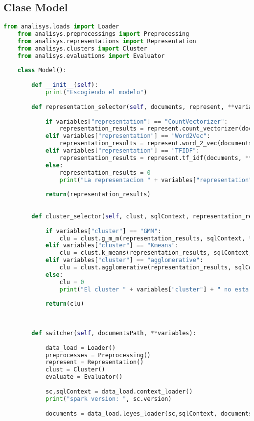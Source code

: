 \documentclass[12pt]{article}
\begin{document}
	\subsection{ Clase Model}
	\begin{lstlisting}[language=Python, caption= Clase model]
	from analisys.loads import Loader
	from analisys.preprocessings import Preprocessing
	from analisys.representations import Representation
	from analisys.clusters import Cluster
	from analisys.evaluations import Evaluator
	
	class Model():
	
		def __init__(self):
			print("Escogiendo el modelo")
		
		def representation_selector(self, documents, represent, **variables):
		
			if variables["representation"] == "CountVectorizer":
				representation_results = represent.count_vectorizer(documents, **variables)
			elif variables["representation"] == "Word2Vec":
				representation_results = represent.word_2_vec(documents, **variables)
			elif variables["representation"] == "TFIDF":
				representation_results = represent.tf_idf(documents, **variables)
			else:
				representation_results = 0
				print("La representacion " + variables["representation"] + " no esta disponible")
			
			return(representation_results)
		
		
		def cluster_selector(self, clust, sqlContext, representation_results,  **variables):
		
			if variables["cluster"] == "GMM":
				clu = clust.g_m_m(representation_results, sqlContext, **variables)
			elif variables["cluster"] == "Kmeans":
				clu = clust.k_means(representation_results, sqlContext, **variables)
			elif variables["cluster"] == "agglomerative":
				clu = clust.agglomerative(representation_results, sqlContext, **variables)
			else:
				clu = 0
				print("El cluster " + variables["cluster"] + " no esta disponible")
			
			return(clu)
		
		
		
		def switcher(self, documentsPath, **variables):
		
			data_load = Loader()
			preprocesses = Preprocessing()
			represent = Representation()
			clust = Cluster()
			evaluate = Evaluator() 
			
			sc,sqlContext = data_load.context_loader()
			print("spark version: ", sc.version)
			
			documents = data_load.leyes_loader(sc,sqlContext, documentsPath)
			

\end{lstlisting}
\end{document}
